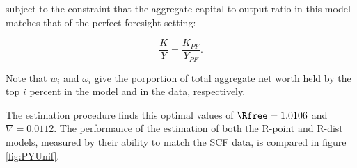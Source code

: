 \documentclass[\econtexRoot/Chp1proposal]{subfiles}
\begin{document}
\par subject to the constraint that the aggregate capital-to-output ratio in this model matches that of the perfect foresight setting:

$$ \frac{K}{Y} = \frac{K_{PF}}{Y_{PF}}. $$

\par Note that $w_i$ and $\omega_i$ give the porportion of total aggregate net worth held by the top $i$ percent in the model and in the data, respectively.

\par The estimation procedure finds this optimal values of $\Rfree = 1.0106$ and $\nabla = 0.0112$. The performance of the estimation of both the R-point and R-dist models, measured by their ability to match the SCF data, is compared in figure \ref{fig:PYUnif}.




\onlyinsubfile{}

\end{document}
